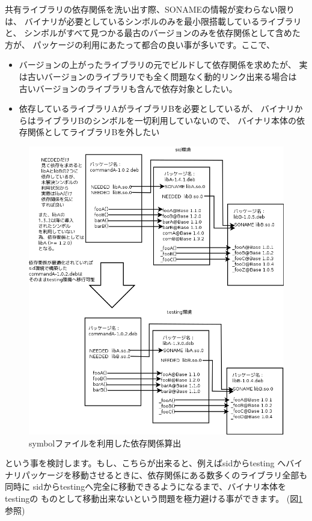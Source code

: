 \documentclass[mingoth,a4paper]{jsarticle}
\begin{document}
 共有ライブラリの依存関係を洗い出す際、SONAMEの情報が変わらない限りは、
バイナリが必要としているシンボルのみを最小限搭載しているライブラリと、
シンボルがすべて見つかる最古のバージョンのみを依存関係として含めた方が、
パッケージの利用にあたって都合の良い事が多いです。ここで、

\begin{itemize}
\item バージョンの上がったライブラリの元でビルドして依存関係を求めたが、
実は古いバージョンのライブラリでも全く問題なく動的リンク出来る場合は
古いバージョンのライブラリも含んで依存対象としたい。
\item 依存しているライブラリAがライブラリBを必要としているが、
バイナリからはライブラリBのシンボルを一切利用していないので、
バイナリ本体の依存関係としてライブラリBを外したい
\end{itemize}

\begin{figure}[ht]
\begin{center}
\includegraphics[width=12cm]{image201208/symbols-advantage.png}
\caption{\label{fig:symbol-deps}symbolファイルを利用した依存関係算出}
\end{center}
\end{figure}

という事を検討します。もし、こちらが出来ると、例えばsidからtesting
へバイナリパッケージを移動させるときに、依存関係にある数多くのライブラリ全部も同時に
sidからtestingへ完全に移動できるようになるまで、バイナリ本体をtestingの
ものとして移動出来ないという問題を極力避ける事ができます。\cite{hertzog}
(図\ref{fig:symbol-deps}参照)
　　　　
\end{document}
